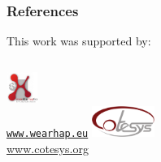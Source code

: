\documentclass[noshadow]{ITRslides}
\begin{document}
\appendix
\begin{frame}
	\frametitle{References}
	\printbibliography
	This work was supported by:
	\vspace{0.2cm}
	\begin{columns}[onlytextwidth,T]
		\centering
		\includegraphics[height=1cm]{wearhap}\\
		\href{http://www.wearhap.eu}{\texttt{www.wearhap.eu}}
		\centering
		\includegraphics[height=1cm]{cotesys}\\
		\url{www.cotesys.org}
	\end{columns}
\end{frame}
\end{document}
